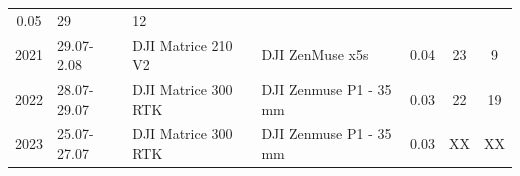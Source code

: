 \begin{table}[p]
\begin{tabular}{c  m{1.8cm} m{3.5cm} m{4.2cm} c c c }
        0.05                                                              & 29
                                                                          & 12
        \\[4mm]
        2021                                                              & 29.07-2.08
                                                                          & DJI Matrice 210 V2
                                                                          & DJI ZenMuse x5s
                                                                          & 0.04
                                                                          & 23
                                                                          &
        9
        \\[4mm]        
        2022                                                              & 28.07-29.07
                                                                          & DJI Matrice 300 RTK
                                                                          & DJI Zenmuse P1 - 35 mm
                                                                          & 0.03
                                                                          & 22
                                                                          &
        19
        \\[4mm]
        2023                                                              & 25.07-27.07
                                                                          & DJI Matrice 300 RTK
                                                                          & DJI Zenmuse P1 - 35 mm
                                                                          & 0.03
                                                                          & XX
                                                                          &
        XX
        \\[4mm]        
        \bottomrule

    \end{tabular}
    \label{tab:3:datasets}
\end{table}

